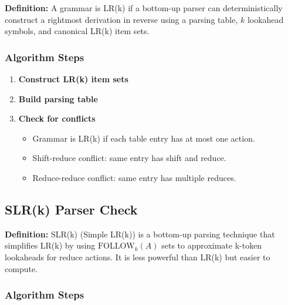 \textbf{Definition:} A grammar is LR(k) if a bottom-up parser can deterministically construct a rightmost derivation in reverse using a parsing table, $k$ lookahead symbols, and canonical LR(k) item sets.

\subsubsection{Algorithm Steps}

\begin{enumerate}
    \item \textbf{Construct LR(k) item sets}

    \item \textbf{Build parsing table}

    \item \textbf{Check for conflicts}
    \begin{itemize}
        \item Grammar is LR(k) if each table entry has at most one action.
        \item Shift-reduce conflict: same entry has shift and reduce.
        \item Reduce-reduce conflict: same entry has multiple reduces.
    \end{itemize}
\end{enumerate}


\subsection{SLR(k) Parser Check}

\textbf{Definition:} SLR(k) (Simple LR(k)) is a bottom-up parsing technique that simplifies LR(k) by using $\text{FOLLOW}_k(A)$ sets to approximate k-token lookaheads for reduce actions. It is less powerful than LR(k) but easier to compute.

\subsubsection{Algorithm Steps}

